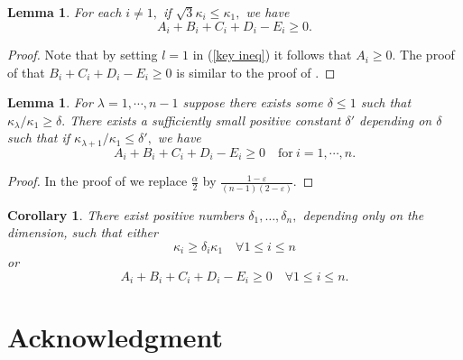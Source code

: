 \documentclass{amsart}
\newtheorem{lemma}[theorem]{Lemma}
\newtheorem{corollary}[theorem]{Corollary}
\theoremstyle{definition}
\theoremstyle{remark}
\numberwithin{equation}{section}
\begin{document}
\begin{lemma}\label{app2}
For each $i\ne 1,$ if $\sqrt{3}\kappa_i\leq \kappa_1,$ we have
\[A_i+B_i+C_i+D_i-E_i\geq 0.\]
\end{lemma}
\begin{proof}
Note that by setting $l=1$ in (\ref{key ineq}) it follows that $A_i\geq 0.$ The proof of that $B_i+C_i+D_i-E_i\geq 0$ is similar to the proof of \cite[Lemma 4.2]{Guan}.
\end{proof}

\begin{lemma}\label{app3}
For $\lambda=1,\cdots,n-1$ suppose there exists some $\delta\leq 1$ such that $\kappa_{\lambda}/\kappa_1\geq \delta.$ There exists a sufficiently small positive constant $\delta'$ depending on $\delta$ such that if $\kappa_{\lambda+1}/\kappa_1\leq \delta',$ we have
\[A_i+B_i+C_i+D_i-E_i\geq 0\quad \text{for}~i=1,\cdots,n.\]
\end{lemma}
\begin{proof}
In the proof of \cite[Lemma 4.3]{Guan} we replace $\frac{\alpha}{2}$ by $\frac{1-\varepsilon}{(n-1)(2-\varepsilon)}$.
\end{proof}

\begin{corollary}\label{Alternative}
There exist positive numbers $\delta_1,\dots,\delta_n,$ depending only on the dimension, such that either
\begin{equation}
\kappa_i\geq \delta_i\kappa_1\quad\forall 1\leq i\leq n
\end{equation}
or
\begin{equation}
A_i+B_i+C_i+D_i-E_i\geq 0\quad\forall 1\leq i\leq n.
\end{equation}
\end{corollary}

\section*{Acknowledgment}
\end{document}
